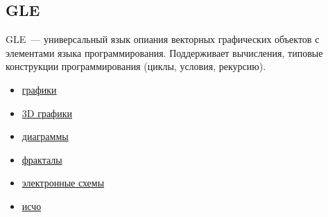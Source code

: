 \subsection{GLE}

GLE\ --- универсальный язык опиания векторных графических объектов с элементами
языка программирования. Поддерживает вычисления, типовые конструкции
программирования (циклы, условия, рекурсию).

\begin{itemize}
  \item\href{http://glx.sourceforge.net/examples/2dplots/index.html}{графики}
  \item\href{http://glx.sourceforge.net/examples/3dplots/index.html}{3D графики}
  \item\href{http://glx.sourceforge.net/examples/diagrams/index.html}{диаграммы}
  \item\href{http://glx.sourceforge.net/examples/fractals/index.html}{фракталы}
  \item\href{http://glx.sourceforge.net/examples/electronic/index.html}{электронные
  схемы}
  \item\href{http://glx.sourceforge.net/examples/other/index.html}{исчо}
\end{itemize}
